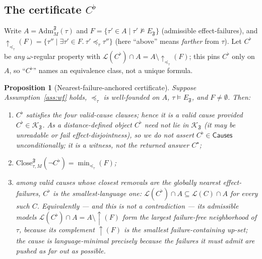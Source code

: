 \documentclass[11pt]{article}
\newtheorem{proposition}{Proposition}
\theoremstyle{remark}
\newcommand{\Close}{\mathrm{Close}}
\newcommand{\Lang}{\mathcal{L}}
\newcommand{\Frame}{\mathfrak{F}}
\newcommand{\Adm}{\mathrm{Adm}}
\begin{document}
\subsection{The certificate \texorpdfstring{\(C^{\flat}\)}{C-flat}}
\label{sec:certificate}

Write \(A=\Adm_M^{\Frame}(\tau)\) and \(F=\{\tau'\in A\mid\tau'\not\models
E_{\Frame}\}\) (admissible effect-failures), and
\(\uparrow_{\preceq_\tau}(F)=\{\tau''\mid\exists\tau'\in F.\ \tau'\preceq_\tau
\tau''\}\) (here ``above'' means \emph{farther} from \(\tau\)). Let \(C^{\flat}\)
be \emph{any} \(\omega\)-regular property with
\(\Lang(C^{\flat})\cap A=A\setminus\uparrow_{\preceq_\tau}(F)\); this pins
\(C^{\flat}\) only on \(A\), so ``\(C^{\flat}\)'' names an equivalence class, not a
unique formula.

\begin{proposition}[Nearest-failure-anchored certificate]
\label{prop:weakest}
Suppose Assumption~\ref{ass:wf} holds, \(\preceq_\tau\) is well-founded on \(A\),
\(\tau\models E_{\Frame}\), and \(F\neq\emptyset\). Then:
\begin{enumerate}[label=(\alph*)]
  \item \(C^{\flat}\) satisfies the four valid-cause \emph{clauses}; hence it is a
        valid cause \emph{provided} \(C^{\flat}\in\mathcal{K}_{\Frame}\). As a
        distance-defined object \(C^{\flat}\) need not lie in \(\mathcal{K}_{\Frame}\)
        (it may be unreadable or fail effect-disjointness), so we do not assert
        \(C^{\flat}\in\mathsf{Causes}\) unconditionally; it is a witness, not the
        returned answer \(C^\star\);
  \item \(\Close_{\tau,M}^{\Frame}(\neg C^{\flat})=\min_{\preceq_\tau}(F)\);
  \item among valid causes whose closest removals are the globally nearest
        effect-failures, \(C^{\flat}\) is the \emph{smallest-language} one:
        \(\Lang(C^{\flat})\cap A\subseteq\Lang(C)\cap A\) for every such \(C\).
        Equivalently --- and this is not a contradiction --- its admissible models
        \(\Lang(C^{\flat})\cap A=A\setminus\uparrow(F)\) form the \emph{largest}
        failure-free neighborhood of \(\tau\), because its complement
        \(\uparrow(F)\) is the \emph{smallest} failure-containing up-set; the cause
        is language-minimal precisely because the failures it must admit are pushed
        as far out as possible.
\end{enumerate}
\end{proposition}
\end{document}
